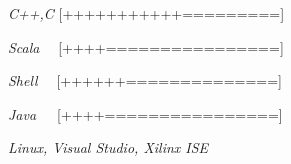 \begin{cvline}
  \cvsingleline 
    {
      \begin{cvitems}
          \item {\it{C++,C}}  {[+++++++++++=========]}
          \item {\it{Scala\,\,\,\,\,\,}}  {[++++================]}
          \item {\it{Shell\,\,\,\,\,\,}}  {[++++++==============]}
          \item {\it{Java\,\,\,\,\,\,\,}}   {[++++================]}
          \item {\it{Linux, Visual Studio, Xilinx ISE}}
      \end{cvitems}
    }
\end{cvline}